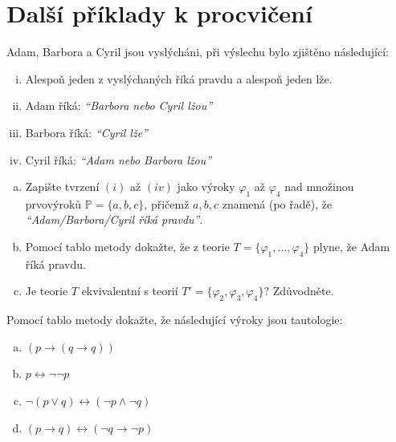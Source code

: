         
\section*{Další příklady k procvičení}


\begin{problem}

    Adam, Barbora a Cyril jsou vyslýcháni, při výslechu bylo zjištěno následující:
    \begin{enumerate}[(i)]\it
        \item Alespoň jeden z vyslýchaných říká pravdu a alespoň jeden lže.
        \item Adam říká: \emph{``Barbora nebo Cyril lžou''}
        \item Barbora říká: \emph{``Cyril lže''}
        \item Cyril říká: \emph{``Adam nebo Barbora lžou''}
    \end{enumerate}
    \begin{enumerate}[(a)]
        \item Zapište tvrzení $(i)$ až $(iv)$ jako výroky $\varphi_1$ až $\varphi_4$ nad množinou prvovýroků $\mathbb{P}=\{a,b,c\}$, přičemž $a,b,c$ znamená (po řadě), že {\it ``Adam/Barbora/Cyril říká pravdu''}.
        \item Pomocí tablo metody dokažte, že z teorie $T = \{\varphi_1, \dots, \varphi_4\}$ plyne, že Adam říká pravdu.
        \item Je teorie $T$ ekvivalentní s teorií $T' = \{\varphi_2, \varphi_3, \varphi_4\}$? Zdůvodněte.    
    \end{enumerate}
    
\end{problem}
        

\begin{problem}

    Pomocí tablo metody dokažte, že následující výroky jsou tautologie:
    \begin{enumerate}[(a)]
        \item $(p\to (q \to q))$
        \item $p \leftrightarrow \neg \neg  p$
        \item $\neg (p \vee q) \leftrightarrow (\neg p \wedge \neg q)$
        \item $(p \to q) \leftrightarrow (\neg q \to \neg p)$    
    \end{enumerate}

\end{problem} 
   

